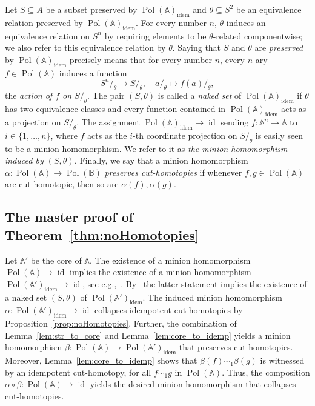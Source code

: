 \documentclass[oneside]{amsart}
\newcommand{\str}[1]{\mathbb{#1}}
\newcommand{\pol}{\operatorname{Pol}}
\newcommand{\idem}{\mathrm{idem}}
\DeclareMathOperator{\id}{id}
\begin{document}
Let $S\subseteq A$ be a subset preserved by $\pol(\str A)_\idem$ and $\theta \subseteq S^2$ be an equivalence relation preserved by $\pol(\str A)_\idem$. For every number $n$, $\theta$ induces an equivalence relation on $S^n$  by requiring elements to be $\theta$-related componentwise; we also refer to this equivalence relation by $\theta$.
Saying that $S$ and $\theta$ are \emph{preserved} by $\pol(\str A)_\idem$ precisely means that for every number $n$, every $n$-ary $f \in \pol(\str A)$ induces a function
\begin{equation*}
    S^n/_\theta \to S/_\theta, \quad a/_\theta \mapsto f(a)/_\theta,
\end{equation*} 
the \emph{action of $f$ on $S/_\theta$}.
The pair $(S, \theta)$ is called a \emph{naked set} of $\pol(\str A)_\idem$ if $\theta$ has two equivalence classes and every function contained in $\pol(\str A)_\idem$ acts as a projection on $S/_\theta$. The assignment $\pol(\str A)_\idem \to \id$ sending $f\colon \str A^n \to \str A$ to $i \in \{1,\dots, n \}$, where $f$ acts as the $i$-th coordinate projection on $S/_\theta$ is easily seen to be a minion homomorphism.
We refer to it as \emph{the minion homomorphism induced by $(S,\theta)$.} 
Finally, we say that a minion homomorphism $\alpha: \pol (\str A) \rightarrow \pol (\str B)$ \emph{preserves cut-homotopies} if whenever $f, g \in \pol (\str A)$ are cut-homotopic, then so are $\alpha(f), \alpha(g)$.


\subsection{The master proof of Theorem~\ref{thm:noHomotopies}}

Let $\str A'$ be the core of $\str A$. 
The existence of a minion homomorphism $\pol(\str A) \to \id$ implies the existence of a minion homomorphism $\pol(\str A')_\idem \to \id$, see e.g.,~\cite{Wonderland}. 
By~\cite[Prop.~4.14]{NakedSet} the latter statement implies the existence of a naked set $(S,\theta)$ of $\pol(\str A')_\idem$. The induced minion homomorphism $\alpha \colon \pol(\str A')_\idem \to \id$ collapses idempotent cut-homotopies by Proposition~\ref{prop:noHomotopies}. Further, the combination of Lemma~\ref{lem:str_to_core} and Lemma~\ref{lem:core_to_idemp} yields a minion homomorphism $\beta \colon \pol(\str A) \to \pol(\str A')_\idem$ that
preserves cut-homotopies. Moreover, Lemma~\ref{lem:core_to_idemp} shows that $\beta(f)\sim_1 \beta(g)$ is witnessed by an idempotent cut-homotopy, for all $f\sim_1 g$ in $\pol(\str A)$.
Thus, the composition $\alpha \circ \beta \colon \pol(\str A) \to \id$ yields the desired minion homomorphism that collapses cut-homotopies.
\end{document}
